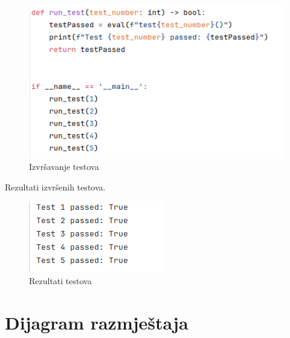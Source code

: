 			\begin{figure}[H]
				\includegraphics[width=\textwidth]{slike/selenium_running.png}
				\centering
				\caption{Izvršavanje testova}
				\label{fig:izvrsavanje-testova}
			\end{figure}
		
			Rezultati izvršenih testova.
			
			\begin{figure}[H]
				\includegraphics[width=\textwidth]{slike/selenium_results.png}
				\centering
				\caption{Rezultati testova}
				\label{fig:rezultati-testova}
			\end{figure}
				
			
			
			
			\eject 
		
		
		\section{Dijagram razmještaja}
			
